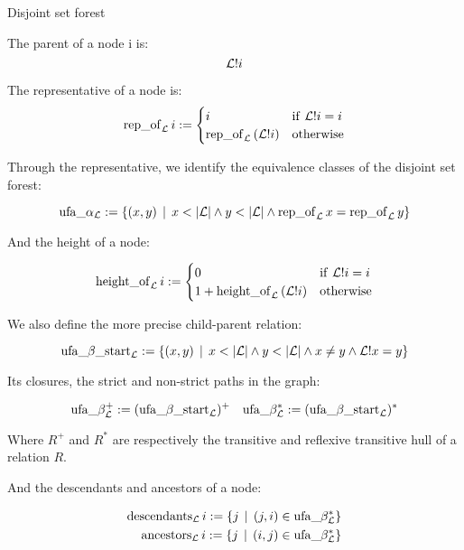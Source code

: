 \documentclass[headsepline,footsepline,footinclude=false,oneside,fontsize=11pt,paper=a4,listof=totoc,bibliography=totoc]{scrbook} %
\begin{document}
\begin{definition}{Disjoint set forest}

The parent of a node i is: 
\begin{equation}
\mathcal{L}!i
\end{equation}

The representative of a node is:
\begin{equation}
\mathrm{rep\_of}_\mathcal{L}\, i := \begin{cases}
i &\mathrm{if}\,\, \mathcal{L}!i = i \\
\mathrm{rep\_of}_\mathcal{L}\, (\mathcal{L}!i) &\mathrm{otherwise}
\end{cases}
\end{equation}

Through the representative, we identify the equivalence classes of the disjoint set forest:

\begin{equation}
\ufaalpha := \{(x,y) \,\mid\, x<|\LL| \land y<|\LL| \land \repof x = \repof y\}
\end{equation}

And the height of a node:

\begin{equation}
	\mathrm{height\_of}_{\mathcal{L}}\, i := \begin{cases}
	0 &\mathrm{if}\,\, \mathcal{L}!i=i\\
	1 + \mathrm{height\_of}_{\mathcal{L}}\, (\mathcal{L}!i) &\mathrm{otherwise}
	\end{cases}
\end{equation}

We also define the more precise child-parent relation:

\begin{equation}
\ufabstart := \{(x,y) \,\mid\, x<|\LL| \land y<|\LL| \land x \neq y \land \LL!x = y \}
\end{equation}

Its closures, the strict and non-strict paths in the graph:

\begin{equation}
\mathrm{ufa\_}\beta^+_\mathcal{L} := (\mathrm{ufa\_}\beta\mathrm{\_start}_\mathcal{L})^+ \quad \mathrm{ufa\_}\beta^*_\mathcal{L} := (\mathrm{ufa\_}\beta\mathrm{\_start}_\mathcal{L})^*
\end{equation}

Where $R^+$ and $R^*$ are respectively the transitive and reflexive transitive hull of a relation $R$.

And the descendants and ancestors of a node:

\begin{align}
\mathrm{descendants}_{\mathcal{L}} \, i := \{j \,\mid\, (j,i) \in \mathrm{ufa\_}\beta^*_\mathcal{L}\} \\
\mathrm{ancestors}_{\mathcal{L}} \, i := \{j \,\mid\, (i,j) \in \mathrm{ufa\_}\beta^*_\mathcal{L}\}
\end{align}

\end{definition}
\end{document}

